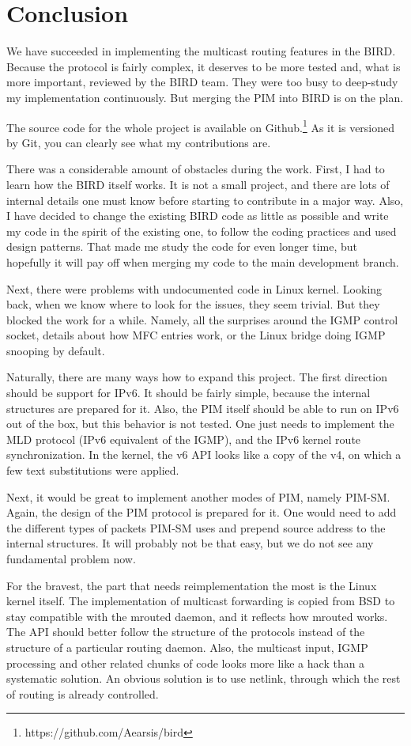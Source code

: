 \chapter*{Conclusion}

We have succeeded in implementing the multicast routing features in the BIRD.
Because the protocol is fairly complex, it deserves to be more tested and, what
is more important, reviewed by the BIRD team. They were too busy to deep-study
my implementation continuously. But merging the PIM into BIRD is on the plan.

The source code for the whole project is available on Github.\footnote{https://github.com/Aearsis/bird}
As it is versioned by Git, you can clearly see what my contributions are.

There was a considerable amount of obstacles during the work. First, I had to
learn how the BIRD itself works. It is not a small project, and there are lots
of internal details one must know before starting to contribute in a major way.
Also, I have decided to change the existing BIRD code as little as possible and
write my code in the spirit of the existing one, to follow the coding practices
and used design patterns. That made me study the code for even longer time, but
hopefully it will pay off when merging my code to the main development branch.

Next, there were problems with undocumented code in Linux kernel. Looking back,
when we know where to look for the issues, they seem trivial. But they blocked
the work for a while. Namely, all the surprises around the IGMP control socket,
details about how MFC entries work, or the Linux bridge doing IGMP snooping by
default.

Naturally, there are many ways how to expand this project. The first direction
should be support for IPv6. It should be fairly simple, because the internal
structures are prepared for it. Also, the PIM itself should be able to run on
IPv6 out of the box, but this behavior is not tested. One just needs to
implement the MLD protocol (IPv6 equivalent of the IGMP), and the IPv6 kernel
route synchronization. In the kernel, the v6 API looks like a copy of the v4,
on which a few text substitutions were applied.

Next, it would be great to implement another modes of PIM, namely PIM-SM.
Again, the design of the PIM protocol is prepared for it. One would need to
add the different types of packets PIM-SM uses and prepend source address to
the internal structures. It will probably not be that easy, but we do not see
any fundamental problem now.

For the bravest, the part that needs reimplementation the most is the Linux
kernel itself. The implementation of multicast forwarding is copied from BSD to
stay compatible with the mrouted daemon, and it reflects how mrouted works.
The API should better follow the structure of the protocols instead of the
structure of a particular routing daemon. Also, the multicast input, IGMP
processing and other related chunks of code looks more like a hack than
a systematic solution. An obvious solution is to use netlink, through which the
rest of routing is already controlled.
